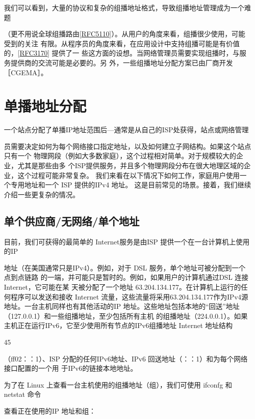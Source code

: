 我们可以看到，大量的协议和复杂的组播地址格式，导致组播地址管理成为一个难题

（更不用说全球组播路由\href{https://www.rfc-editor.org/rfc/rfc5110}{[RFC5110]}）。从用户的角度来看，组播很少使用，可能受到的关注
有限。从程序员的角度来看，在应用设计中支持组播可能是有价值的，\href{https://www.rfc-editor.org/rfc/rfc3170}{[RFC3170]} 提供了一
些这方面的设想。当网络管理员需要实现组播时，与服务提供商的交流可能是必要的。另
外，一些组播地址分配方案已由厂商开发［CGEMA］。

\section{单播地址分配}
一个站点分配了单播IP地址范围后—通常是从自己的ISP处获得，站点或网络管理

员需要决定如何为每个网络接口指定地址，以及如何建立子网结构。如果这个站点只有一个
物理网段（例如大多数家庭），这个过程相对简单。对于规模较大的企业，尤其是那些由多
个ISP提供服务，并且多个物理网段分布在很大地理区域的企业，这个过程可能非常复杂。
我们来看在以下情况下如何工作，家庭用户使用一个专用地址和一个 ISP 提供的IPv4 地址。
这是目前常见的场景。接着，我们继续介绍一些更复杂的情况。

\subsection{单个供应商/无网络/单个地址}
目前，我们可获得的最简单的 Internet服务是由ISP 提供一个在一台计算机上使用的IP

地址（在美国通常只是IPv4）。例如，对于 DSL 服务，单个地址可被分配到一个点到点链路
的一端，并可能只是暂时的。例如，如果用户的计算机通过DSL 连接 Internet，它可能在某
天被分配了一个地址 63.204.134.177。在计算机上运行的任何程序可以发送和接收 Internet
流量，这些流量将采用63.204.134.177作为IPv4源地址。一台主机同样也有其他活动的IP
地址。这些地址包括本地的“回送”地址（127.0.0.1）和一些组播地址，至少包括所有主机
的组播地址（224.0.0.1）。如果主机正在运行IPv6，它至少使用所有节点的IPv6组播地址
Internet 地址结构

45

（ff02：：1）、ISP 分配的任何IPv6地址、IPv6 回送地址（：：1）和为每个网络接口配置的一个用
于IPv6的链接本地地址。

为了在 Linux 上查看一台主机使用的组播地址（组），我们可使用 ifconfg 和 netstat 命令

查看正在使用的IP 地址和组：

